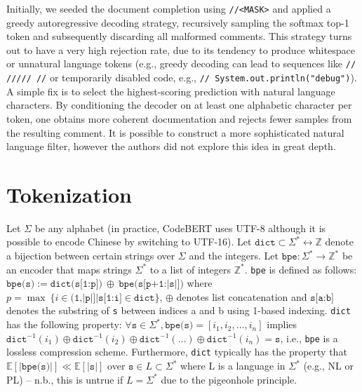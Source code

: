 \documentclass[usenames,dvipsnames]{article} %
\begin{document}
  Initially, we seeded the document completion using \lstinline|//<MASK>| and applied a greedy autoregressive decoding strategy, recursively sampling the softmax top-1 token and subsequently discarding all malformed comments. This strategy turns out to have a very high rejection rate, due to its tendency to produce whitespace or unnatural language tokens (e.g., greedy decoding can lead to sequences like \lstinline|// ///// //| or temporarily disabled code, e.g., \lstinline|// System.out.println("debug")|). A simple fix is to select the highest-scoring prediction with natural language characters. By conditioning the decoder on at least one alphabetic character per token, one obtains more coherent documentation and rejects fewer samples from the resulting comment. It is possible to construct a more sophisticated natural language filter, however the authors did not explore this idea in great depth.

\section{Tokenization}

  Let $\Sigma$ be any alphabet (in practice, CodeBERT uses UTF-8 although it is possible to encode Chinese by switching to UTF-16).
  Let $\texttt{dict} \subset \Sigma^*\leftrightarrow\mathbb Z$ denote a bijection between certain strings over $\Sigma$ and the integers.
  Let $\texttt{bpe}: \Sigma^*\rightarrow\mathbb{Z}^*$ be an encoder that maps strings $\Sigma^*$ to a list of integers $\mathbb{Z}^*$.
  \texttt{bpe} is defined as follows: $\texttt{bpe(s)} := \texttt{dict(s[1:p])}\:\oplus\:\texttt{bpe(s[p+1:|s|])}$ where $p = \max\:\{ i \in \texttt{(1,|p|]} | \texttt{s[1:i]} \in \texttt{dict} \}$, $\oplus$ denotes list concatenation and $\texttt{s[a:b]}$ denotes the substring of \texttt{s} between indices a and b using 1-based indexing.
  \texttt{dict} has the following property: $\forall \texttt{s} \in \Sigma^*, \texttt{bpe(s)} = [i_1, i_2, \ldots, i_n]$ implies $\texttt{dict}^{-1}(i_1) \oplus \texttt{dict}^{-1}(i_2) \oplus \texttt{dict}^{-1}(\ldots) \oplus \texttt{dict}^{-1}(i_n) = \texttt{s}$, i.e., \texttt{bpe} is a lossless compression scheme.
  Furthermore, \texttt{dict} typically has the property that $\mathbb{E}[|\texttt{bpe(s)}|] \ll \mathbb{E}[|\texttt{s}|]$ over $\texttt{s} \in L \subset \Sigma^*$ where L is a language in $\Sigma^*$ (e.g., NL or PL) -- n.b., this is untrue if $L = \Sigma^*$ due to the pigeonhole principle.
\end{document}
